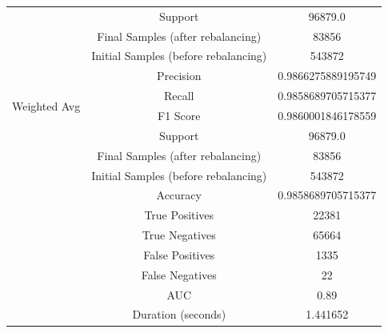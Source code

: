 \begin{longtable}{|c|c|c|}
 & Support & 96879.0 \\
 & Final Samples (after rebalancing) & 83856 \\
 & Initial Samples (before rebalancing) & 543872 \\
\hline
\multirow{4}{*}{Weighted Avg} & Precision & 0.9866275889195749 \\
 & Recall & 0.9858689705715377 \\
 & F1 Score & 0.9860001846178559 \\
 & Support & 96879.0 \\
 & Final Samples (after rebalancing) & 83856 \\
 & Initial Samples (before rebalancing) & 543872 \\
\hline
& Accuracy & 0.9858689705715377 \\ \hline
& True Positives & 22381 \\ \hline
& True Negatives & 65664 \\ \hline
& False Positives & 1335 \\ \hline
& False Negatives & 22 \\ \hline
& AUC & 0.89 \\ \hline
& Duration (seconds) & 1.441652 \\ \hline
\end{longtable}


